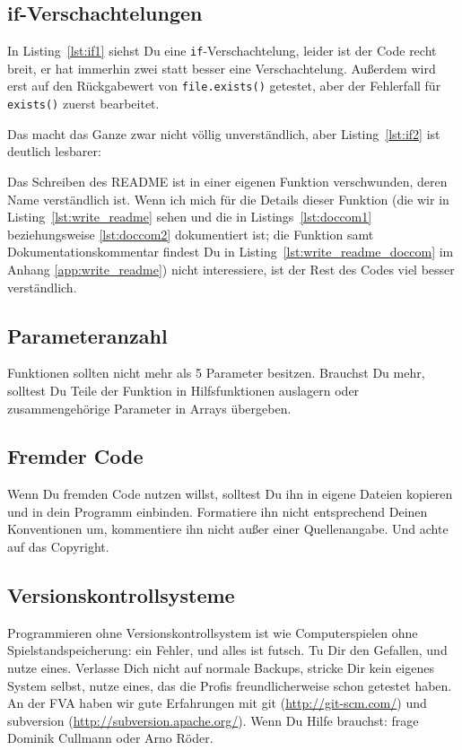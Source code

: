 \documentclass[twoside]{scrartcl}
\providecommand{\code}[1]{\texttt{#1}}
\begin{document}
\subsection{if-Verschachtelungen\label{sec:if}}
In Listing~\ref{lst:if1} siehst Du eine \code{if}-Verschachtelung, leider ist
der Code recht breit, er hat immerhin zwei statt besser eine Verschachtelung.
Au\ss{}erdem wird erst auf den R\"u{}ckgabewert von
\code{file.exists()} getestet, aber der Fehlerfall f\"u{}r
\code{exists()} zuerst bearbeitet.



Das macht das Ganze zwar nicht v\"o{}llig unverst\"a{}ndlich, aber
Listing~\ref{lst:if2} ist deutlich lesbarer:



Das Schreiben des README ist in
einer eigenen Funktion verschwunden, deren Name verst\"a{}ndlich ist. Wenn ich
mich f\"u{}r die Details dieser Funktion 
(die wir in Listing~\ref{lst:write_readme} sehen und die in
Listings~\ref{lst:doccom1} beziehungsweise \ref{lst:doccom2} dokumentiert ist;
die Funktion samt Dokumentationskommentar findest Du in 
Listing~\ref{lst:write_readme_doccom} im Anhang \ref{app:write_readme})
nicht interessiere, ist der Rest des Codes viel besser verst\"a{}ndlich.



\subsection{Parameteranzahl\label{sec:parameteranzahl}} Funktionen sollten nicht
mehr als 5 Parameter
besitzen.
Brauchst Du mehr, solltest Du Teile der Funktion in Hilfsfunktionen auslagern
oder zusammengeh\"o{}rige Parameter in Arrays \"u{}bergeben.

\subsection{Fremder Code} Wenn Du fremden Code nutzen willst, solltest Du ihn in
eigene Dateien kopieren und in dein Programm einbinden. 
Formatiere ihn nicht entsprechend Deinen Konventionen um, 
kommentiere ihn nicht au\ss{}er einer Quellenangabe. 
Und achte auf das Copyright.

\subsection{Versionskontrollsysteme\label{sec:vcs}}
Programmieren ohne Versionskontrollsystem ist wie Computerspielen ohne 
Spielstandspeicherung: ein Fehler, und alles ist futsch.
Tu Dir den Gefallen, und nutze eines.
Verlasse Dich nicht auf normale Backups, stricke Dir kein eigenes System selbst,
nutze eines, das die Profis freundlicherweise schon getestet haben. 
An der FVA haben wir gute Erfahrungen mit git (\url{http://git-scm.com/}) und 
subversion (\url{http://subversion.apache.org/}).
Wenn Du Hilfe brauchst: frage Dominik Cullmann oder Arno R\"o{}der.


\appendix
\end{document}
